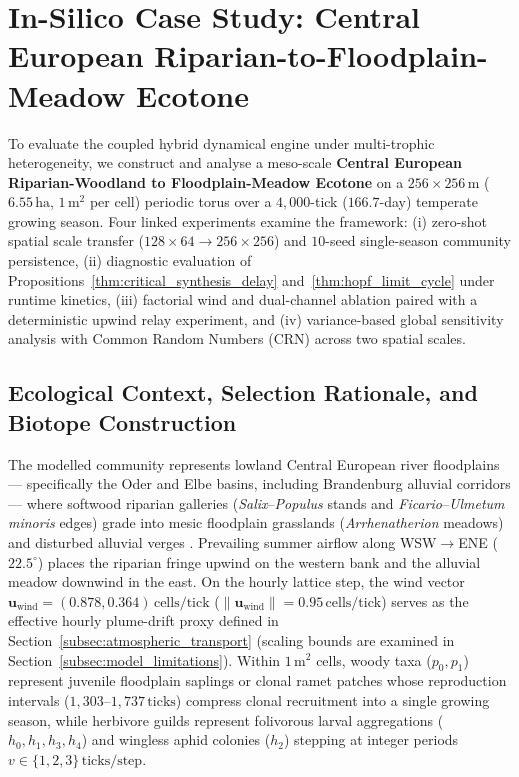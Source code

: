 
\section{In-Silico Case Study: Central European Riparian-to-Floodplain-Meadow Ecotone}
\label{sec:case_studies}

To evaluate the coupled hybrid dynamical engine under multi-trophic heterogeneity, we construct and analyse a meso-scale \textbf{Central European Riparian-Woodland to Floodplain-Meadow Ecotone} on a $256 \times 256\,\text{m}$ ($6.55\,\text{ha}$, $1\,\text{m}^2$ per cell) periodic torus over a $4{,}000$-tick ($166.7$-day) temperate growing season. Four linked experiments examine the framework: (i) zero-shot spatial scale transfer ($128 \times 64 \to 256 \times 256$) and $10$-seed single-season community persistence, (ii) diagnostic evaluation of Propositions~\ref{thm:critical_synthesis_delay} and~\ref{thm:hopf_limit_cycle} under runtime kinetics, (iii) factorial wind and dual-channel ablation paired with a deterministic upwind relay experiment, and (iv) variance-based global sensitivity analysis with Common Random Numbers (CRN) across two spatial scales.

\subsection{Ecological Context, Selection Rationale, and Biotope Construction}
\label{sec:ecotone_design}

The modelled community represents lowland Central European river floodplains --- specifically the Oder and Elbe basins, including Brandenburg alluvial corridors --- where softwood riparian galleries (\textit{Salix}--\textit{Populus} stands and \textit{Ficario}--\textit{Ulmetum minoris} edges) grade into mesic floodplain grasslands (\textit{Arrhenatherion} meadows) and disturbed alluvial verges \cite{leuschner2017ecology, leuschner2017nonforest}. Prevailing summer airflow along WSW$\to$ENE ($22.5^\circ$) places the riparian fringe upwind on the western bank and the alluvial meadow downwind in the east. On the hourly lattice step, the wind vector $\mathbf{u}_{\text{wind}} = (0.878, 0.364)\,\text{cells/tick}$ ($\|\mathbf{u}_{\text{wind}}\| = 0.95\,\text{cells/tick}$) serves as the effective hourly plume-drift proxy defined in Section~\ref{subsec:atmospheric_transport} (scaling bounds are examined in Section~\ref{subsec:model_limitations}). Within $1\,\text{m}^2$ cells, woody taxa ($p_0, p_1$) represent juvenile floodplain saplings or clonal ramet patches whose reproduction intervals ($1{,}303\text{--}1{,}737\,\text{ticks}$) compress clonal recruitment into a single growing season, while herbivore guilds represent folivorous larval aggregations ($h_0, h_1, h_3, h_4$) and wingless aphid colonies ($h_2$) stepping at integer periods $v \in \{1, 2, 3\}\,\text{ticks/step}$.

